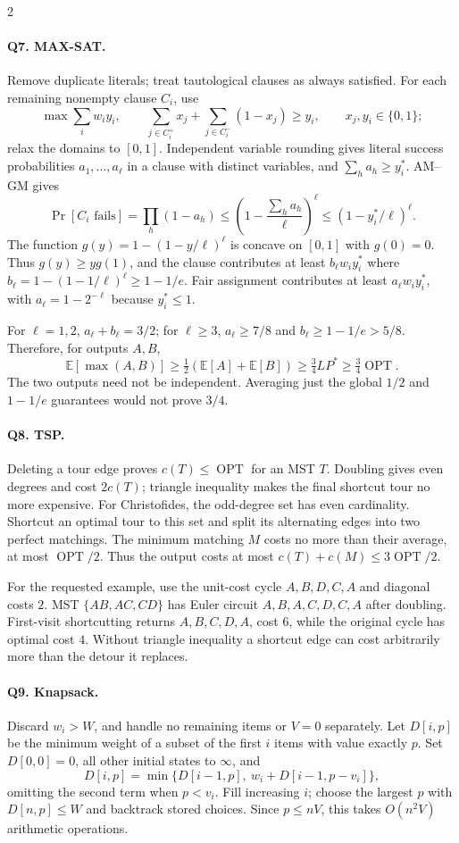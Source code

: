 \documentclass[8pt]{extarticle}
\theoremstyle{definition}
\newcommand{\OPT}{\operatorname{OPT}}
\begin{document}
\begin{multicols*}{2}
\paragraph{Q7. MAX-SAT.}
Remove duplicate literals; treat tautological clauses as always satisfied.
For each remaining nonempty clause $C_i$, use
\[
\max\sum_iw_iy_i,\qquad
\sum_{j\in C_i^+}x_j+\sum_{j\in C_i^-}(1-x_j)\ge y_i,
\qquad x_j,y_i\in\{0,1\};
\]
relax the domains to $[0,1]$.  Independent variable rounding gives literal
success probabilities $a_1,\ldots,a_\ell$ in a clause with distinct
variables, and $\sum_h a_h\ge y_i^*$.  AM--GM gives
\[
\Pr[C_i\text{ fails}]=\prod_h(1-a_h)
\le\left(1-\frac{\sum_h a_h}{\ell}\right)^\ell
\le(1-y_i^*/\ell)^\ell.
\]
The function $g(y)=1-(1-y/\ell)^\ell$ is concave on $[0,1]$ with
$g(0)=0$.  Thus $g(y)\ge yg(1)$, and the clause contributes at least
$b_\ell w_i y_i^*$ where $b_\ell=1-(1-1/\ell)^\ell\ge1-1/e$.
Fair assignment contributes at least $a_\ell w_i y_i^*$, with
$a_\ell=1-2^{-\ell}$ because $y_i^*\le1$.

For $\ell=1,2$, $a_\ell+b_\ell=3/2$; for $\ell\ge3$,
$a_\ell\ge7/8$ and $b_\ell\ge1-1/e>5/8$.  Therefore, for outputs $A,B$,
\[
\mathbb E[\max(A,B)]\ge\tfrac12(\mathbb E[A]+\mathbb E[B])
\ge\tfrac34 LP^*\ge\tfrac34\OPT.
\]
The two outputs need not be independent.  Averaging just the global
$1/2$ and $1-1/e$ guarantees would not prove $3/4$.

\paragraph{Q8. TSP.}
Deleting a tour edge proves $c(T)\le\OPT$ for an MST $T$.  Doubling gives
even degrees and cost $2c(T)$; triangle inequality makes the final shortcut
tour no more expensive.  For Christofides, the odd-degree set has even
cardinality.  Shortcut an optimal tour to this set and split its alternating
edges into two perfect matchings.  The minimum matching $M$ costs no more
than their average, at most $\OPT/2$.  Thus the output costs at most
$c(T)+c(M)\le3\OPT/2$.

For the requested example, use the unit-cost cycle $A,B,D,C,A$ and diagonal
costs $2$.  MST $\{AB,AC,CD\}$ has Euler circuit $A,B,A,C,D,C,A$ after
doubling.  First-visit shortcutting returns $A,B,C,D,A$, cost $6$, while
the original cycle has optimal cost $4$.  Without triangle inequality a
shortcut edge can cost arbitrarily more than the detour it replaces.

\paragraph{Q9. Knapsack.}
Discard $w_i>W$, and handle no remaining items or $V=0$ separately.
Let $D[i,p]$ be the minimum weight of a subset of the first $i$ items with
value exactly $p$.  Set $D[0,0]=0$, all other initial states to $\infty$, and
\[
D[i,p]=\min\{D[i-1,p],\ w_i+D[i-1,p-v_i]\},
\]
omitting the second term when $p<v_i$.  Fill increasing $i$; choose the
largest $p$ with $D[n,p]\le W$ and backtrack stored choices.  Since
$p\le nV$, this takes $O(n^2V)$ arithmetic operations.


\end{multicols*}
\end{document}

